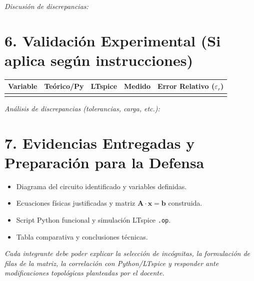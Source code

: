 \documentclass[11pt, a4paper]{article}
\begin{document}
\vspace{0.4cm}
\textit{Discusión de discrepancias:} \hrulefill

\section*{6. Validación Experimental (Si aplica según instrucciones)}
\begin{tabularx}{\linewidth}{@{}|l|X|X|X|X|@{}}
    \hline
    \textbf{Variable} & \textbf{Teórico/Py} & \textbf{LTspice} & \textbf{Medido} & \textbf{Error Relativo ($\varepsilon_r$)} \\
    \hline
    & & & & \\
    \hline
\end{tabularx}

\vspace{0.4cm}
\textit{Análisis de discrepancias (tolerancias, carga, etc.):} \hrulefill

\section*{7. Evidencias Entregadas y Preparación para la Defensa}
\begin{itemize}[label=$\square$]
    \item Diagrama del circuito identificado y variables definidas.
    \item Ecuaciones físicas justificadas y matriz $\mathbf{A}\cdot\mathbf{x}=\mathbf{b}$ construida.
    \item Script Python funcional y simulación LTspice \texttt{.op}.
    \item Tabla comparativa y conclusiones técnicas.
\end{itemize}
\textit{Cada integrante debe poder explicar la selección de incógnitas, la formulación de filas de la matriz, la correlación con Python/LTspice y responder ante modificaciones topológicas planteadas por el docente.}
\end{document}
